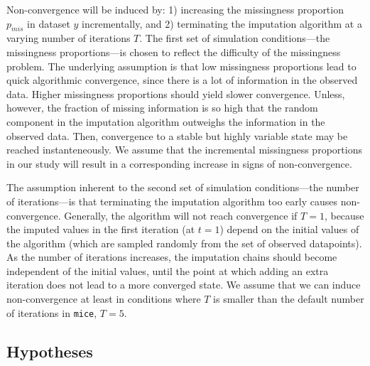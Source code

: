 \documentclass[Royal,times,sageh]{sagej}
\begin{document}
Non-convergence will be induced by: 1) increasing the missingness
proportion \(p_{mis}\) in dataset \(y\) incrementally, and 2)
terminating the imputation algorithm at a varying number of iterations
\(T\). The first set of simulation conditions---the missingness
proportions---is chosen to reflect the difficulty of the missingness
problem. The underlying assumption is that low missingness proportions
lead to quick algorithmic convergence, since there is a lot of
information in the observed data. Higher missingness proportions should
yield slower convergence. Unless, however, the fraction of missing
information is so high that the random component in the imputation
algorithm outweighs the information in the observed data. Then,
convergence to a stable but highly variable state may be reached
instanteneously. We assume that the incremental missingness proportions
in our study will result in a corresponding increase in signs of
non-convergence.

The assumption inherent to the second set of simulation conditions---the
number of iterations---is that terminating the imputation algorithm too
early causes non-convergence. Generally, the algorithm will not reach
convergence if \(T=1\), because the imputed values in the first
iteration (at \(t=1\)) depend on the initial values of the algorithm
(which are sampled randomly from the set of observed datapoints). As the
number of iterations increases, the imputation chains should become
independent of the initial values, until the point at which adding an
extra iteration does not lead to a more converged state. We assume that
we can induce non-convergence at least in conditions where \(T\) is
smaller than the default number of iterations in \texttt{mice}, \(T=5\).

\hypertarget{hypotheses}{%
\subsection{Hypotheses}\label{hypotheses}}
\end{document}
